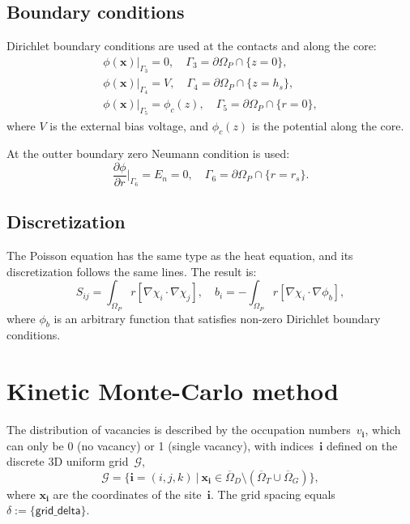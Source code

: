 \documentclass[10pt]{article}
\renewcommand{\vec}[1]{\mathbf{#1}}
\newcommand{\vi}{\vec{i}}
\newcommand{\vx}{\vec{x}}
\begin{document}
\subsection{Boundary conditions}

Dirichlet boundary conditions are used at the contacts and along the core:
\begin{gather}
	\phi(\vx)\vert_{\Gamma_3} = 0, \quad
	\Gamma_3 = \partial\Omega_P \cap \{ z = 0 \},\\
	\phi(\vx)\vert_{\Gamma_4} = V, \quad
	\Gamma_4 = \partial\Omega_P \cap \{ z = h_s \},\\
	\phi(\vx)\vert_{\Gamma_5} = \phi_c(z),
	\quad \Gamma_5 = \partial\Omega_P \cap \{ r = 0 \},
\end{gather}
where $V$ is the external bias voltage, and $\phi_c(z)$ is the potential along
the core.

At the outter boundary zero Neumann condition is used:
\begin{equation}
	\frac{\partial \phi}{\partial r} \bigg\vert_{\Gamma_6} = E_n = 0, \quad
	\Gamma_6 = \partial \Omega_P \cap \{ r = r_s \}.
\end{equation}

\subsection{Discretization}

The Poisson equation has the same type as the heat equation, and its
discretization follows the same lines. The result is:
\begin{equation}
	S_{ij} = \int_{\Omega_P} r [ \nabla\chi_i \cdot \nabla\chi_j ], \quad
	b_i = - \int_{\Omega_P} r [ \nabla\chi_i \cdot \nabla \phi_b ],
\end{equation}
where $\phi_b$ is an arbitrary function that satisfies non-zero Dirichlet
boundary conditions.

\section{Kinetic Monte-Carlo method}

The distribution of vacancies is described by the occupation numbers~$v_\vi$,
which can only be 0 (no vacancy) or 1 (single vacancy), with indices~$\vi$
defined on the discrete 3D uniform grid~$\mathcal{G}$,
\begin{equation}
	\mathcal{G} = \{ \vi = (i, j, k) \ | \ \vx_\vi \in
	\overline\Omega_D \setminus ( \overline\Omega_T \cup \overline\Omega_G ) \},
\end{equation}
where $\vx_\vi$ are the coordinates of the site~$\vi$. The grid spacing equals
$\delta := \{ \mathsf{grid\_delta} \}$.
\end{document}
